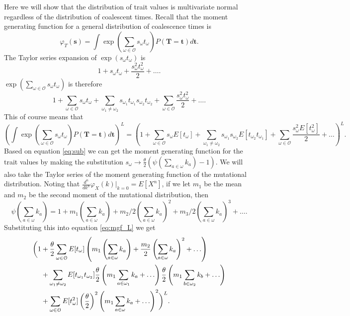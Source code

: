 Here we will show that the distribution of trait values is multivariate normal
regardless of the distribution of coalescent times. Recall that the moment
generating function for a general distribution of coalescence times is
\begin{equation}
  \varphi_T(\mathbf{s}) = \int \exp \left( \sum_{\omega \in \mathcal{O}} s_{\omega}t_{\omega} \right)
  P(\mathbf{T}=\mathbf{t})d\mathbf{t}.
\end{equation}
The Taylor series expansion of $\exp \left( s_{\omega}t_{\omega} \right)$ is
\begin{equation}
  1 + s_{\omega}t_{\omega} + \frac{s_{\omega}^2t_{\omega}^2}{2} + \ldots. \nonumber
\end{equation}
$\exp \left( \sum_{\omega \in \mathcal{O}} s_{\omega}t_{\omega} \right)$ is therefore
\begin{equation}
  1 + \sum_{\omega \in \mathcal{O}} s_{\omega}t_{\omega} +
  \sum_{\omega_1 \neq \omega_2} s_{\omega_1}t_{\omega_1}s_{\omega_2}t_{\omega_2} + 
  \sum_{\omega \in \mathcal{O}} \frac{s_{\omega}^2t_{\omega}^2}{2} + \ldots. \nonumber
\end{equation}
This of course means that
\begin{equation}
  \label{eq:mgf_L}
  \left(\int \exp \left( \sum_{\omega \in \mathcal{O}} s_{\omega}t_{\omega}
  \right)P(\mathbf{T}=\mathbf{t})d\mathbf{t}\right)^L = \left(1 + \sum_{\omega \in \mathcal{O}}
  s_{\omega}E[t_{\omega}] + \sum_{\omega_1 \neq \omega_2}
  s_{\omega_1}s_{\omega_2}E[t_{\omega_2}t_{\omega_1}] + \sum_{\omega \in
    \mathcal{O}} \frac{s_{\omega}^2E[t_{\omega}^2]}{2} + \ldots\right)^L. 
\end{equation}
Based on equation \ref{eq:sub} we can get the moment generating function for the
trait values by making the substitution $s_{\omega}\to \frac{\theta}{2} \left(
\psi\left(\sum_{a \in \omega}k_{a}\right) -1 \right)$. We will also take the
Taylor series of the moment generating function of the mutational distribution.
Noting that $\frac{d^n}{dk^n}\varphi_X(k)\Bigr|_{k=0} = E[X^n]$, if we let $m_1$
be the mean and $m_2$ be the second moment of the mutational distribution, then
\begin{equation}
  \psi\left( \sum_{a \in \omega} k_a \right) = 1 + m_1 \left( \sum_{a \in \omega}
  k_a\right) + m_2/2\left( \sum_{a \in \omega} k_a\right)^2 + 
m_3/2\left( \sum_{a \in \omega} k_a\right)^3 +\ldots.
  \nonumber
\end{equation}
Substituting this into equation \ref{eq:mgf_L} we get
\begin{align}
  \biggl( 1 &+ \frac{\theta}{2} \sum_{\omega \in \mathcal{O}} E[t_{\omega}]\left( m_1 \left(
  \sum_{a \in \omega} k_a \right) + \frac{m_2}{2} \left( \sum_{a \in \omega}
  k_a\right)^2 + \ldots \right) \\
  &+ \sum_{\omega_1 \neq \omega_2} E[t_{\omega_1}t_{\omega_2}]\frac{\theta}{2}\left( m_1 \sum_{a \in \omega_1} k_a + \ldots \right)
  \frac{\theta}{2} \left( m_1 \sum_{b \in \omega_2} k_b + \ldots \right) \\
  &+ \sum_{\omega \in \mathcal{O}} E[t^2_{\omega}] \left(\frac{\theta}{2}\right)^2\left(m_1 \sum_{a \in \omega} k_a +
  \ldots \right)^2\biggr)^L.
\end{align}
